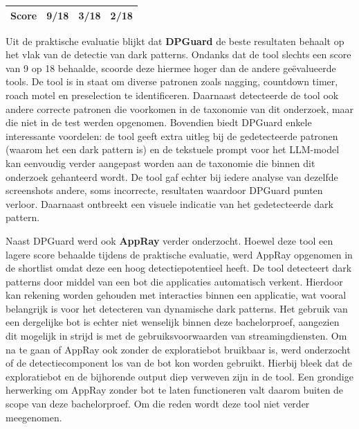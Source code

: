 \begin{table}[H]
\begin{tabular}{l|cc|cc|cc}
      \midrule
      
      \textbf{Score} & \multicolumn{2}{c|}{\textbf{9}/18}  & \multicolumn{2}{c|}{\textbf{3}/18} & \multicolumn{2}{c}{\textbf{2}/18} \\
      
      \bottomrule
    \end{tabular}
\end{table}


Uit de praktische evaluatie blijkt dat \textbf{DPGuard} de beste resultaten behaalt op het vlak van de detectie van dark patterns. Ondanks dat de tool slechts een score van 9 op 18 behaalde, scoorde deze hiermee hoger dan de andere geëvalueerde tools. De tool is in staat om diverse patronen zoals nagging, countdown timer, roach motel en preselection te identificeren. Daarnaast detecteerde de tool ook andere correcte patronen die voorkomen in de taxonomie van dit onderzoek, maar die niet in de test werden opgenomen. Bovendien biedt DPGuard enkele interessante voordelen: de tool geeft extra uitleg bij de gedetecteerde patronen (waarom het een dark pattern is) en de tekstuele prompt voor het LLM-model kan eenvoudig verder aangepast worden aan de taxonomie die binnen dit onderzoek gehanteerd wordt. De tool gaf echter bij iedere analyse van dezelfde screenshots andere, soms incorrecte, resultaten waardoor DPGuard punten verloor. Daarnaast ontbreekt een visuele indicatie van het gedetecteerde dark pattern.

\vspace{1em}

Naast DPGuard werd ook \textbf{AppRay} verder onderzocht. Hoewel deze tool een lagere score behaalde tijdens de praktische evaluatie, werd AppRay opgenomen in de shortlist omdat deze een hoog detectiepotentieel heeft. De tool detecteert dark patterns door middel van een bot die applicaties automatisch verkent. Hierdoor kan rekening worden gehouden met interacties binnen een applicatie, wat vooral belangrijk is voor het detecteren van dynamische dark patterns. Het gebruik van een dergelijke bot is echter niet wenselijk binnen deze bachelorproef, aangezien dit mogelijk in strijd is met de gebruiksvoorwaarden van streamingdiensten. Om na te gaan of AppRay ook zonder de exploratiebot bruikbaar is, werd onderzocht of de detectiecomponent los van de bot kon worden gebruikt. Hierbij bleek dat de exploratiebot en de bijhorende output diep verweven zijn in de tool. Een grondige herwerking om AppRay zonder bot te laten functioneren valt daarom buiten de scope van deze bachelorproef. Om die reden wordt deze tool niet verder meegenomen.

